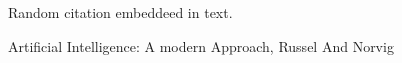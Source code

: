 \documentclass{article}
\begin{document}
Random citation \cite{AI} embeddeed in text.

\newpage

 \begin{thebibliography}{99}
Artificial Intelligence: A modern Approach, Russel And Norvig
 \end{thebibliography}
\end{document}
